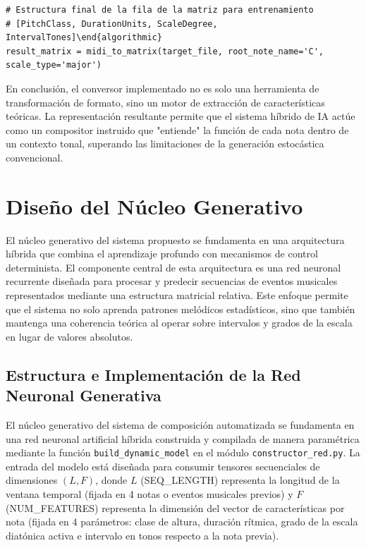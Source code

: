 \documentclass[12pt]{report}
\begin{document}
\begin{verbatim}
# Estructura final de la fila de la matriz para entrenamiento
# [PitchClass, DurationUnits, ScaleDegree, IntervalTones]\end{algorithmic}
result_matrix = midi_to_matrix(target_file, root_note_name='C', scale_type='major')
\end{verbatim}

En conclusión, el conversor implementado no es solo una herramienta de transformación de formato, sino un motor de extracción de características teóricas. La representación resultante permite que el sistema híbrido de IA actúe como un compositor instruido que "entiende" la función de cada nota dentro de un contexto tonal, superando las limitaciones de la generación estocástica convencional.

\section{Diseño del Núcleo Generativo}
El núcleo generativo del sistema propuesto se fundamenta en una arquitectura híbrida que combina el aprendizaje profundo con mecanismos de control determinista. El componente central de esta arquitectura es una red neuronal recurrente diseñada para procesar y predecir secuencias de eventos musicales representados mediante una estructura matricial relativa. Este enfoque permite que el sistema no solo aprenda patrones melódicos estadísticos, sino que también mantenga una coherencia teórica al operar sobre intervalos y grados de la escala en lugar de valores absolutos.

\subsection{Estructura e Implementación de la Red Neuronal Generativa}

El núcleo generativo del sistema de composición automatizada se fundamenta en una red neuronal artificial híbrida construida y compilada de manera paramétrica mediante la función \texttt{build\_dynamic\_model} en el módulo \texttt{constructor\_red.py}. La entrada del modelo está diseñada para consumir tensores secuenciales de dimensiones $(L, F)$, donde $L$ (SEQ\_LENGTH) representa la longitud de la ventana temporal (fijada en 4 notas o eventos musicales previos) y $F$ (NUM\_FEATURES) representa la dimensión del vector de características por nota (fijada en 4 parámetros: clase de altura, duración rítmica, grado de la escala diatónica activa e intervalo en tonos respecto a la nota previa).
\end{document}
